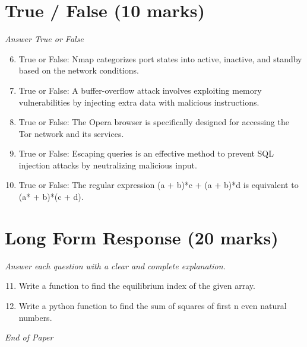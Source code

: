 \documentclass[12pt]{article}
\begin{document}
\section*{True / False (10 marks)}
\textit{Answer True or False}
\begin{enumerate}[label=\arabic*.]
\setcounter{enumi}{5}
\item True or False: Nmap categorizes port states into active, inactive, and standby based on the network conditions.
\item True or False: A buffer-overflow attack involves exploiting memory vulnerabilities by injecting extra data with malicious instructions.
\item True or False: The Opera browser is specifically designed for accessing the Tor network and its services.
\item True or False: Escaping queries is an effective method to prevent SQL injection attacks by neutralizing malicious input.
\item True or False: The regular expression (a + b)*c + (a + b)*d is equivalent to (a* + b)*(c + d).
\end{enumerate}

\section*{Long Form Response (20 marks)}
\textit{Answer each question with a clear and complete explanation.}
\begin{enumerate}[label=\arabic*.]
\setcounter{enumi}{10}
\item Write a function to find the equilibrium index of the given array.
\item Write a python function to find the sum of squares of first n even natural numbers.
\end{enumerate}

\vfill
\noindent\textit{End of Paper}
\end{document}
